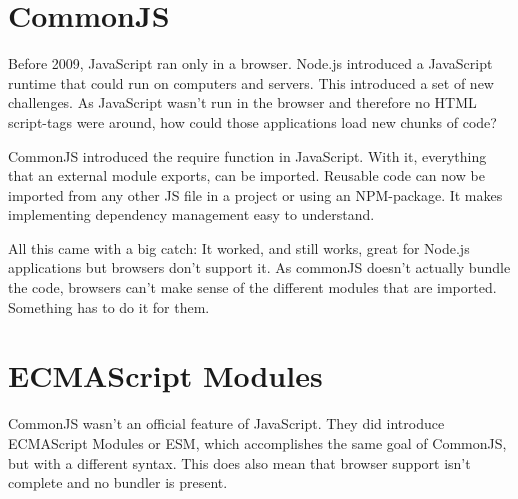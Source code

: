\section{CommonJS}
Before 2009, JavaScript ran only in a browser. Node.js introduced a JavaScript runtime that could run on computers and servers. This introduced a set of new challenges. As JavaScript wasn’t run in the browser and therefore no HTML script-tags were around, how could those applications load new chunks of code? 

CommonJS introduced the require function in JavaScript. With it, everything that an external module exports, can be imported. Reusable code can now be imported from any other JS file in a project or using an NPM-package. It makes implementing dependency management easy to understand.

All this came with a big catch: It worked, and still works, great for Node.js applications but browsers don’t support it. As commonJS doesn’t actually bundle the code, browsers can’t make sense of the different modules that are imported. Something has to do it for them. 

\section{ECMAScript Modules}
CommonJS wasn’t an official feature of JavaScript. They did introduce ECMAScript Modules or ESM, which accomplishes the same goal of CommonJS, but with a different syntax. This does also mean that browser support isn’t complete and no bundler is present. 

